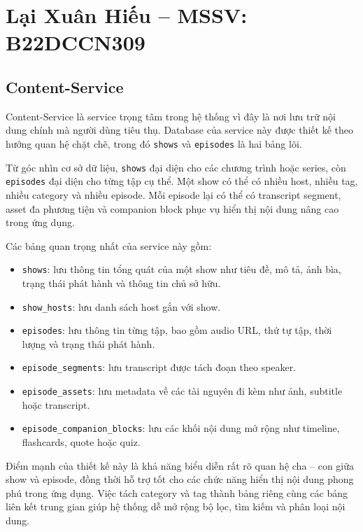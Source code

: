 \documentclass[12pt,a4paper]{report}
\begin{document}
\section{Lại Xuân Hiếu -- MSSV: B22DCCN309}

\subsection{Content-Service}

Content-Service là service trọng tâm trong hệ thống vì đây là nơi lưu trữ nội dung chính mà người dùng tiêu thụ. Database của service này được thiết kế theo hướng quan hệ chặt chẽ, trong đó \texttt{shows} và \texttt{episodes} là hai bảng lõi.

Từ góc nhìn cơ sở dữ liệu, \texttt{shows} đại diện cho các chương trình hoặc series, còn \texttt{episodes} đại diện cho từng tập cụ thể. Một show có thể có nhiều host, nhiều tag, nhiều category và nhiều episode. Mỗi episode lại có thể có transcript segment, asset đa phương tiện và companion block phục vụ hiển thị nội dung nâng cao trong ứng dụng.

Các bảng quan trọng nhất của service này gồm:

\begin{itemize}
    \item \texttt{shows}: lưu thông tin tổng quát của một show như tiêu đề, mô tả, ảnh bìa, trạng thái phát hành và thông tin chủ sở hữu.
    \item \texttt{show\_hosts}: lưu danh sách host gắn với show.
    \item \texttt{episodes}: lưu thông tin từng tập, bao gồm audio URL, thứ tự tập, thời lượng và trạng thái phát hành.
    \item \texttt{episode\_segments}: lưu transcript được tách đoạn theo speaker.
    \item \texttt{episode\_assets}: lưu metadata về các tài nguyên đi kèm như ảnh, subtitle hoặc transcript.
    \item \texttt{episode\_companion\_blocks}: lưu các khối nội dung mở rộng như timeline, flashcards, quote hoặc quiz.
\end{itemize}

Điểm mạnh của thiết kế này là khả năng biểu diễn rất rõ quan hệ cha -- con giữa show và episode, đồng thời hỗ trợ tốt cho các chức năng hiển thị nội dung phong phú trong ứng dụng. Việc tách category và tag thành bảng riêng cùng các bảng liên kết trung gian giúp hệ thống dễ mở rộng bộ lọc, tìm kiếm và phân loại nội dung.
\end{document}
